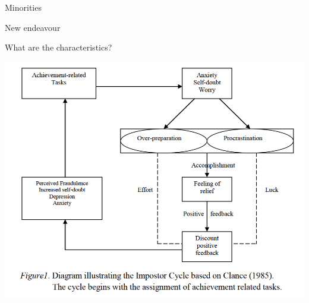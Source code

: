 \documentclass[aspectratio=169]{beamer}
\begin{document}
\begin{frame}
  \begin{center}
    \Huge Minorities
    \\ \small \cite{apa13}
  \end{center}
\end{frame}

\begin{frame}
  \begin{center}
    \Huge New endeavour
    \\ \small \cite{apa13}
  \end{center}
\end{frame}

\begin{frame}
  \begin{center}
    \Huge What are the characteristics?
  \end{center}
\end{frame}

\begin{frame}
  \begin{center}
    \includegraphics[scale=.5]{./assets/clance-impostor-cycle.png}
    \\ \small \cite{sakulku11}
  \end{center}
\end{frame}
\end{document}
